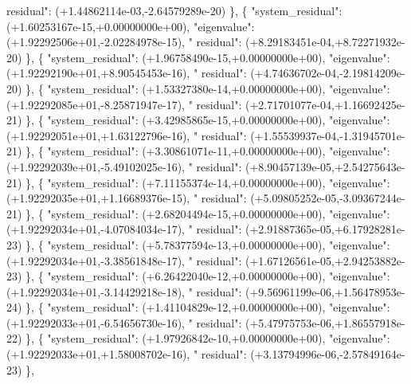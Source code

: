 \begin{DoxyCode}
{      residual"}: (+1.44862114e-03,-2.64579289e-20) \},
\{ \textcolor{stringliteral}{"system\_residual"}: (+1.60253167e-15,+0.00000000e+00), \textcolor{stringliteral}{"eigenvalue"}: (+1.92292506e+01,-2.02284978e-15), \textcolor{stringliteral}{"
      residual"}: (+8.29183451e-04,+8.72271932e-20) \},
\{ \textcolor{stringliteral}{"system\_residual"}: (+1.96758490e-15,+0.00000000e+00), \textcolor{stringliteral}{"eigenvalue"}: (+1.92292190e+01,+8.90545453e-16), \textcolor{stringliteral}{"
      residual"}: (+4.74636702e-04,-2.19814209e-20) \},
\{ \textcolor{stringliteral}{"system\_residual"}: (+1.53327380e-14,+0.00000000e+00), \textcolor{stringliteral}{"eigenvalue"}: (+1.92292085e+01,-8.25871947e-17), \textcolor{stringliteral}{"
      residual"}: (+2.71701077e-04,+1.16692425e-21) \},
\{ \textcolor{stringliteral}{"system\_residual"}: (+3.42985865e-15,+0.00000000e+00), \textcolor{stringliteral}{"eigenvalue"}: (+1.92292051e+01,+1.63122796e-16), \textcolor{stringliteral}{"
      residual"}: (+1.55539937e-04,-1.31945701e-21) \},
\{ \textcolor{stringliteral}{"system\_residual"}: (+3.30861071e-11,+0.00000000e+00), \textcolor{stringliteral}{"eigenvalue"}: (+1.92292039e+01,-5.49102025e-16), \textcolor{stringliteral}{"
      residual"}: (+8.90457139e-05,+2.54275643e-21) \},
\{ \textcolor{stringliteral}{"system\_residual"}: (+7.11155374e-14,+0.00000000e+00), \textcolor{stringliteral}{"eigenvalue"}: (+1.92292035e+01,+1.16689376e-15), \textcolor{stringliteral}{"
      residual"}: (+5.09805252e-05,-3.09367244e-21) \},
\{ \textcolor{stringliteral}{"system\_residual"}: (+2.68204494e-15,+0.00000000e+00), \textcolor{stringliteral}{"eigenvalue"}: (+1.92292034e+01,-4.07084034e-17), \textcolor{stringliteral}{"
      residual"}: (+2.91887365e-05,+6.17928281e-23) \},
\{ \textcolor{stringliteral}{"system\_residual"}: (+5.78377594e-13,+0.00000000e+00), \textcolor{stringliteral}{"eigenvalue"}: (+1.92292034e+01,-3.38561848e-17), \textcolor{stringliteral}{"
      residual"}: (+1.67126561e-05,+2.94253882e-23) \},
\{ \textcolor{stringliteral}{"system\_residual"}: (+6.26422040e-12,+0.00000000e+00), \textcolor{stringliteral}{"eigenvalue"}: (+1.92292034e+01,-3.14429218e-18), \textcolor{stringliteral}{"
      residual"}: (+9.56961199e-06,+1.56478953e-24) \},
\{ \textcolor{stringliteral}{"system\_residual"}: (+1.41104829e-12,+0.00000000e+00), \textcolor{stringliteral}{"eigenvalue"}: (+1.92292033e+01,-6.54656730e-16), \textcolor{stringliteral}{"
      residual"}: (+5.47975753e-06,+1.86557918e-22) \},
\{ \textcolor{stringliteral}{"system\_residual"}: (+1.97926842e-10,+0.00000000e+00), \textcolor{stringliteral}{"eigenvalue"}: (+1.92292033e+01,+1.58008702e-16), \textcolor{stringliteral}{"
      residual"}: (+3.13794996e-06,-2.57849164e-23) \},
\end{DoxyCode}


